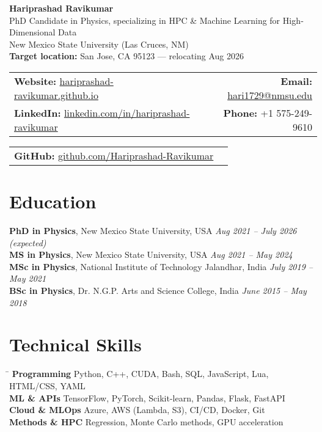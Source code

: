 \documentclass[11pt]{article}
\begin{document}
\begin{center}
  \textbf{\Huge Hariprashad Ravikumar} \\[0.6em]
  \vspace{0.5em}
  PhD Candidate in Physics, specializing in HPC \& Machine Learning for High‐Dimensional Data \\
  New Mexico State University (Las Cruces, NM)\\[0.4em]
  \textbf{Target location:} San Jose, CA 95123 — relocating Aug 2026
\end{center}

\begin{tabularx}{\textwidth}{@{}Xr@{}}
    \textbf{Website:} \href{https://hariprashad-ravikumar.github.io}{hariprashad-ravikumar.github.io} & \textbf{Email:} \href{mailto:hari1729@nmsu.edu}{hari1729@nmsu.edu}  \\
    \textbf{LinkedIn:} \href{https://www.linkedin.com/in/hariprashad-ravikumar}{linkedin.com/in/hariprashad-ravikumar} & \textbf{Phone:} +1 575-249-9610 
\end{tabularx}
\vspace{-1em}
\begin{tabularx}{\textwidth}{@{}Xr@{}}
\textbf{GitHub:} \href{https://github.com/Hariprashad-Ravikumar}{github.com/Hariprashad-Ravikumar}  \\
\end{tabularx}

\vspace{0.5em}
\section*{Education}
\vspace{0.3em}

\textbf{PhD in Physics}, New Mexico State University, USA \hfill \textit{Aug 2021 – July 2026 (expected)} \\
\textbf{MS in Physics}, New Mexico State University, USA \hfill \textit{Aug 2021 – May 2024} \\
\textbf{MSc in Physics}, National Institute of Technology Jalandhar, India \hfill \textit{July 2019 – May 2021} \\
\textbf{BSc in Physics}, Dr. N.G.P. Arts and Science College, India \hfill \textit{June 2015 – May 2018}


\section*{Technical Skills}
\vspace{-0.3em}
\begin{tabbing}
\hspace{3.5cm} \= \kill
\textbf{Programming} \> Python, C++, CUDA, Bash, SQL, JavaScript, Lua, HTML/CSS, YAML \\
\textbf{ML \& APIs} \> TensorFlow, PyTorch, Scikit-learn, Pandas, Flask, FastAPI\\
\textbf{Cloud \& MLOps} \> Azure, AWS (Lambda, S3), CI/CD, Docker, Git\\
\textbf{Methods \& HPC} \> Regression, Monte Carlo methods, GPU acceleration
\end{tabbing}
\end{document}
